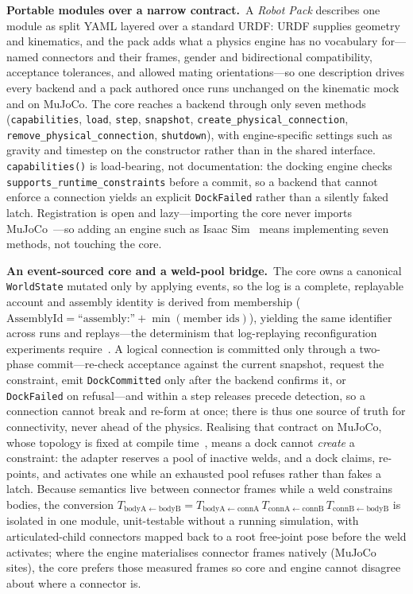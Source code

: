 \noindent\textbf{Portable modules over a narrow contract.}\ A \emph{Robot Pack} describes one module as split YAML layered over a standard
URDF: URDF supplies geometry and kinematics, and the pack adds what a physics
engine has no vocabulary for---named connectors and their frames, gender and
bidirectional compatibility, acceptance tolerances, and allowed mating
orientations---so one description drives every backend and a pack authored once
runs unchanged on the kinematic mock and on MuJoCo. The core reaches a backend
through only seven methods (\texttt{capabilities}, \texttt{load}, \texttt{step},
\texttt{snapshot}, \texttt{create\_physical\_connection},
\texttt{remove\_physical\_connection}, \texttt{shutdown}), with engine-specific
settings such as gravity and timestep on the constructor rather than in the
shared interface. \texttt{capabilities()} is load-bearing, not documentation: the
docking engine checks \texttt{supports\_runtime\_constraints} before a commit, so
a backend that cannot enforce a connection yields an explicit \texttt{DockFailed}
rather than a silently faked latch. Registration is open and lazy---importing the
core never imports MuJoCo~\cite{todorov2012mujoco}---so adding an engine such as
Isaac Sim~\cite{nvidia_isaacsim} means implementing seven methods, not touching
the core.

\noindent\textbf{An event-sourced core and a weld-pool bridge.}\ The core owns a canonical \texttt{WorldState} mutated only by applying events, so
the log is a complete, replayable account and assembly identity is derived from
membership
(\(\mathrm{AssemblyId}=\text{``assembly:''}+\min(\text{member ids})\)), yielding
the same identifier across runs and replays---the determinism that log-replaying
reconfiguration experiments require~\cite{liu2019distributed}. A logical
connection is committed only through a two-phase commit---re-check acceptance
against the current snapshot, request the constraint, emit \texttt{DockCommitted}
only after the backend confirms it, or \texttt{DockFailed} on refusal---and
within a step releases precede detection, so a connection cannot break and
re-form at once; there is thus one source of truth for connectivity, never ahead
of the physics. Realising that contract on MuJoCo, whose topology is fixed at
compile time~\cite{todorov2012mujoco}, means a dock cannot \emph{create} a
constraint: the adapter reserves a pool of inactive welds, and a dock claims,
re-points, and activates one while an exhausted pool refuses rather than fakes a
latch. Because semantics live between connector frames while a weld constrains
bodies, the conversion
\(T_{\mathrm{bodyA}\leftarrow\mathrm{bodyB}}
= T_{\mathrm{bodyA}\leftarrow\mathrm{connA}}\,
T_{\mathrm{connA}\leftarrow\mathrm{connB}}\,
T_{\mathrm{connB}\leftarrow\mathrm{bodyB}}\)
is isolated in one module, unit-testable without a running simulation, with
articulated-child connectors mapped back to a root free-joint pose before the
weld activates; where the engine materialises connector frames natively (MuJoCo
sites), the core prefers those measured frames so core and engine cannot disagree
about where a connector is.

